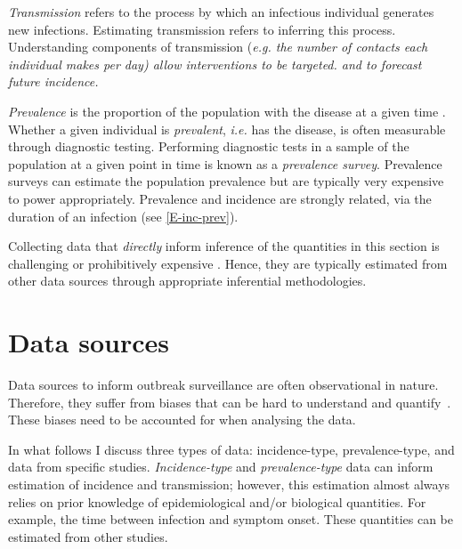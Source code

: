 \documentclass[thesis.tex]{subfiles}
\begin{document}
\emph{Transmission} refers to the process by which an infectious individual generates new infections. Estimating transmission refers to inferring this process. Understanding components of transmission  (\it{e.g.} the number of contacts each individual makes per day) allow interventions to be targeted.
and to forecast future incidence.

\emph{Prevalence} is the proportion of the population with the disease at a given time .
Whether a given individual is \emph{prevalent}, {\it{i.e.}} has the disease, is often measurable through diagnostic testing.
Performing diagnostic tests in a sample of the population at a given point in time is known as a \emph{prevalence survey}.
Prevalence surveys can estimate the population prevalence but are typically very expensive to power appropriately.
Prevalence and incidence are strongly related, via the duration of an infection (see \cref{E-inc-prev}).


Collecting data that {\it directly} inform inference of the quantities in this section is challenging or prohibitively expensive .
Hence, they are typically estimated from other data sources through appropriate inferential methodologies.{}

\section{Data sources}

Data sources to inform outbreak surveillance are often observational in nature.
Therefore, they suffer from biases that can be hard to understand and quantify~\autocite{shadboltChallenges}.
These biases need to be accounted for when analysing the data.

In what follows I discuss three types of data: incidence-type, prevalence-type, and data from specific studies.
\emph{Incidence-type} and \emph{prevalence-type} data can inform estimation of incidence and transmission; however, this estimation almost always relies on prior knowledge of epidemiological and/or biological quantities.
For example, the time between infection and symptom onset. These quantities can be estimated from other studies.
\end{document}
